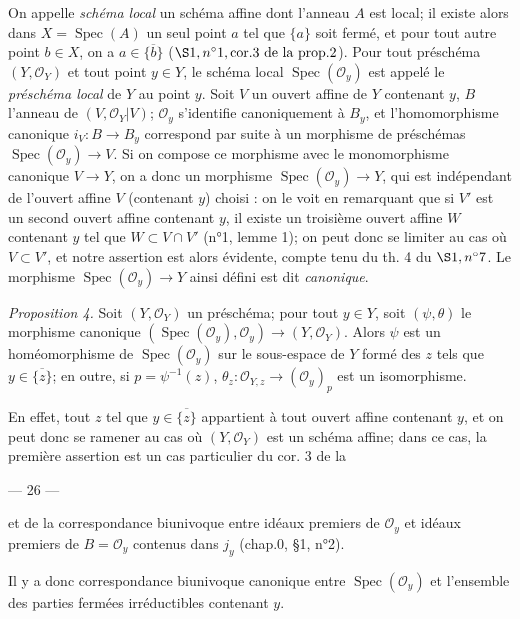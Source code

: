On appelle \emph{schéma local} un schéma affine dont l'anneau $A$ est local; il existe alors dans $X = \operatorname{Spec}(A)$ un seul point $a$ tel que $\{a\}$ soit fermé, et pour tout autre point $b \in X$, on a $a \in \overline{\{b\}}$ ($\S 1, n^\circ 1, \text{cor.} 3 \text{ de la prop.} 2$). Pour tout préschéma $(Y, \mathcal{O}_Y)$ et tout point $y \in Y$, le schéma local $\operatorname{Spec}(\mathcal{O}_y)$ est appelé le \emph{préschéma local} de $Y$ au point $y$. Soit $V$ un ouvert affine de $Y$ contenant $y$, $B$ l'anneau de $(V, \mathcal{O}_Y|V)$; $\mathcal{O}_y$ s'identifie canoniquement à $B_y$, et l'homomorphisme canonique $i_V : B \to B_y$ correspond par suite à un morphisme de préschémas $\operatorname{Spec}(\mathcal{O}_y) \to V$. Si on compose ce morphisme avec le monomorphisme canonique $V \to Y$, on a donc un morphisme $\operatorname{Spec}(\mathcal{O}_y) \to Y$, qui est indépendant de l'ouvert affine $V$ (contenant $y$) choisi : on le voit en remarquant que si $V'$ est un second ouvert affine contenant $y$, il existe un troisième ouvert affine $W$ contenant $y$ tel que $W \subset V \cap V'$ (n°1, lemme 1); on peut donc se limiter au cas où $V \subset V'$, et notre assertion est alors évidente, compte tenu du th. 4 du $\S 1, n^\circ 7$. Le morphisme $\operatorname{Spec}(\mathcal{O}_y) \to Y$ ainsi défini est dit \emph{canonique}.

\emph{Proposition 4.} Soit $(Y, \mathcal{O}_Y)$ un préschéma; pour tout $y \in Y$, soit $(\psi, \theta)$ le morphisme canonique $(\operatorname{Spec}(\mathcal{O}_y), \mathcal{O}_y) \to (Y, \mathcal{O}_Y)$. Alors $\psi$ est un homéomorphisme de $\operatorname{Spec}(\mathcal{O}_y)$ sur le sous-espace de $Y$ formé des $z$ tels que $y \in \overline{\{z\}}$; en outre, si $p = \psi^{-1}(z)$, $\theta_z : \mathcal{O}_{Y,z} \to (\mathcal{O}_y)_p$ est un isomorphisme.

En effet, tout $z$ tel que $y \in \overline{\{z\}}$ appartient à tout ouvert affine contenant $y$, et on peut donc se ramener au cas où $(Y, \mathcal{O}_Y)$ est un schéma affine; dans ce cas, la première assertion est un cas particulier du cor. 3 de la

\newpage


\noindent --- 26 ---

\noindent et de la correspondance biunivoque entre idéaux premiers de $\mathcal{O}_y$ et idéaux premiers de $B = \mathcal{O}_y$ contenus dans $j_y$ (chap.0, §1, n°2).

\noindent Il y a donc correspondance biunivoque canonique entre $\operatorname{Spec}(\mathcal{O}_y)$ et l'ensemble des parties fermées irréductibles contenant $y$.

